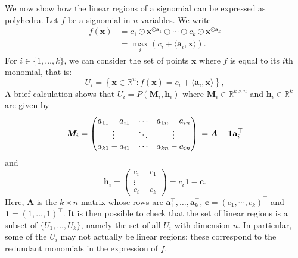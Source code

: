 \documentclass[10pt]{article}
\theoremstyle{definition}
\theoremstyle{remark}
\newcommand{\RR}{{\mathbb{R}}}
\renewcommand{\vec}[1]{\mathbf{#1}}
\def\va{{\vec{a}}}
\def\vc{{\bm{c}}}
\def\vh{{\vec{h}}}
\def\vx{{\vec{x}}}
\def\mA{{\bm{A}}}
\def\mM{{\bm{M}}}
\begin{document}
We now show how the linear regions of a signomial can be expressed as polyhedra. Let $f$ be a signomial in $n$ variables. We write
\begin{align*}
    f(\vx) & = c_1 \odot \vx^{\odot \va_1} \oplus \dotsb \oplus c_k \odot \vx^{\odot \va_k} \\
       & = \max_i \left(c_i +\langle\va_i, \vx \rangle\right).
\end{align*}
For $i\in\{1,\dots,k\}$, we can consider the set of points $\vx$ where $f$ is equal to its $i$th monomial, that is:
$$
U_i=\left\{\vx\in\mathbb{R}^n:f(\vx)=c_i+\langle\va_i,\vx\rangle\right\},
$$
A brief calculation shows that
$
U_i = P(\mM_i, \vh_i)
$
where $\mM_i \in \RR^{k \times n}$ and $\vh_i \in \RR^k$ are given by
$$
    \mM_i = \begin{pmatrix}
        a_{11} - a_{i1} & \dotsb & a_{1n} - a_{in} \\
        \vdots & \ddots & \vdots \\
        a_{k1} - a_{i1} & \dotsb & a_{kn} - a_{in}
    \end{pmatrix} \\
    = \mA - \mathbf{1}\va_i^{\top}
$$
and
$$
\vh_i = \begin{pmatrix}
    c_i - c_1 \\
    \vdots \\
    c_i - c_k
\end{pmatrix} =
c_i \mathbf{1} - \mathbf{c}.
$$
Here, $\mA$ is the $k\times n$ matrix whose rows are $\va_1^{\top},\dotsc,\va_k^{\top}$, $\vc = (c_1, \dotsb, c_k)^{\top}$ and $\mathbf{1} =(1, \dotsc, 1)^{\top}$.
It is then possible to check that the set of linear regions is a subset of $\{U_1, \dotsc, U_k\}$, namely the set of all $U_i$ with dimension $n$. In particular, some of the $U_i$ may not actually be linear regions: these correspond to the redundant monomials in the expression of $f$.
\end{document}
